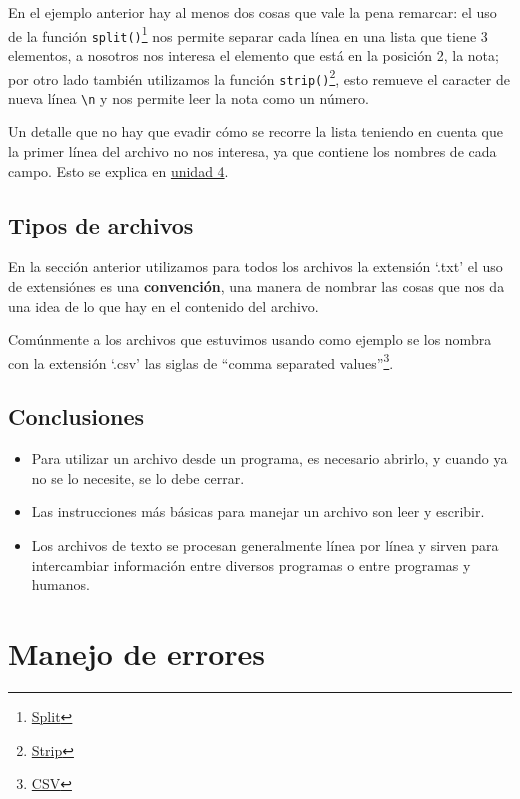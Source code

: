 \documentclass[
  letterpaper,
  DIV=11,
  numbers=noendperiod]{scrreprt}
\providecommand{\tightlist}{%
  \setlength{\itemsep}{0pt}\setlength{\parskip}{0pt}}\usepackage{longtable,booktabs,array}
\begin{document}
En el ejemplo anterior hay al menos dos cosas que vale la pena remarcar:
el uso de la función \texttt{split()}\footnote{\href{https://docs.python.org/es/3/library/stdtypes.html\#str.split}{Split}}
nos permite separar cada línea en una lista que tiene 3 elementos, a
nosotros nos interesa el elemento que está en la posición 2, la nota;
por otro lado también utilizamos la función \texttt{strip()}\footnote{\href{https://docs.python.org/es/3/library/stdtypes.html\#str.strip}{Strip}},
esto remueve el caracter de nueva línea \texttt{\textbackslash{}n} y nos
permite leer la nota como un número.

Un detalle que no hay que evadir cómo se recorre la lista teniendo en
cuenta que la primer línea del archivo no nos interesa, ya que contiene
los nombres de cada campo. Esto se explica en
\hyperref[listas-como-secuencias]{unidad 4}.

\subsection{Tipos de archivos}\label{tipos-de-archivos}

En la sección anterior utilizamos para todos los archivos la extensión
`.txt' el uso de extensiónes es una \textbf{convención}, una manera de
nombrar las cosas que nos da una idea de lo que hay en el contenido del
archivo.

Comúnmente a los archivos que estuvimos usando como ejemplo se los
nombra con la extensión `.csv' las siglas de ``comma separated
values''\footnote{\href{https://es.wikipedia.org/wiki/Valores_separados_por_comas}{CSV}}.

\subsection{Conclusiones}\label{conclusiones}

\begin{itemize}
\tightlist
\item
  Para utilizar un archivo desde un programa, es necesario abrirlo, y
  cuando ya no se lo necesite, se lo debe cerrar.
\item
  Las instrucciones más básicas para manejar un archivo son leer y
  escribir.
\item
  Los archivos de texto se procesan generalmente línea por línea y
  sirven para intercambiar información entre diversos programas o entre
  programas y humanos.
\end{itemize}

\section{Manejo de errores}\label{manejo-de-errores}
\end{document}
